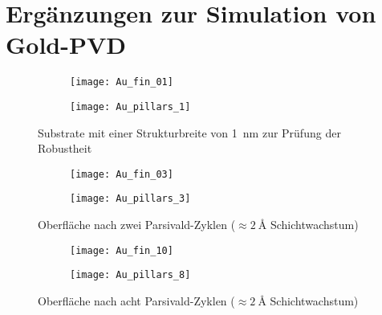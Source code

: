 \chapter{Ergänzungen zur Simulation von Gold-PVD}

\begin{figure}[!h]
  \captionsetup[subfigure]{singlelinecheck=false}
  \def\subfigwidth{0.49\textwidth}

  \begin{subfigure}[t]{\subfigwidth}
    \texttt{[image: Au\_fin\_01]}
    \label{fig:goldnanostructures-fins}
  \end{subfigure}
  \hfill
  \begin{subfigure}[t]{\subfigwidth}
    \texttt{[image: Au\_pillars\_1]}
    \label{fig:goldnanostructures-columns}
  \end{subfigure}

  \caption{Substrate mit einer Strukturbreite von \SI{1}{\nano\meter} zur Prüfung der Robustheit}
  \label{fig:goldnanostructures}

\end{figure}

\begin{figure}[!h]
  \captionsetup[subfigure]{singlelinecheck=false}
  \def\subfigwidth{0.49\textwidth}

  \begin{subfigure}[t]{\subfigwidth}
    \texttt{[image: Au\_fin\_03]}
    \label{fig:goldnanostructures-fins}
  \end{subfigure}
  \hfill
  \begin{subfigure}[t]{\subfigwidth}
    \texttt{[image: Au\_pillars\_3]}
    \label{fig:goldnanostructures-columns}
  \end{subfigure}

  \caption{Oberfläche nach zwei Parsivald-Zyklen ($\approx \SI{2}{\angstrom}$ Schichtwachstum)}
  \label{fig:goldnanostructures}

\end{figure}

\begin{figure}[!h]
  \captionsetup[subfigure]{singlelinecheck=false}
  \def\subfigwidth{0.49\textwidth}

  \begin{subfigure}[t]{\subfigwidth}
    \texttt{[image: Au\_fin\_10]}
    \label{fig:goldnanostructures-fins}
  \end{subfigure}
  \hfill
  \begin{subfigure}[t]{\subfigwidth}
    \texttt{[image: Au\_pillars\_8]}
    \label{fig:goldnanostructures-columns}
  \end{subfigure}

  \caption{Oberfläche nach acht Parsivald-Zyklen ($\approx \SI{2}{\angstrom}$ Schichtwachstum)}
  \label{fig:goldnanostructures}

\end{figure}
